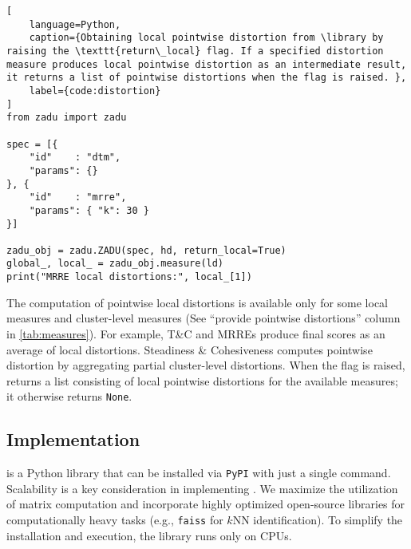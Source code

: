 \begin{lstlisting}[
    language=Python, 
    caption={Obtaining local pointwise distortion from \library by raising the \texttt{return\_local} flag. If a specified distortion measure produces local pointwise distortion as an intermediate result, it returns a list of pointwise distortions when the flag is raised. },
    label={code:distortion}
]
from zadu import zadu

spec = [{
    "id"    : "dtm",
    "params": {}
}, {
    "id"    : "mrre",
    "params": { "k": 30 }
}]

zadu_obj = zadu.ZADU(spec, hd, return_local=True)
global_, local_ = zadu_obj.measure(ld)
print("MRRE local distortions:", local_[1])

\end{lstlisting}

The computation of pointwise local distortions is available only for some local measures and cluster-level measures (See ``provide pointwise distortions'' column in \autoref{tab:measures}). For example, T\&C and MRREs produce final scores as an average of local distortions. Steadiness \& Cohesiveness \cite{jeon21tvcg} computes pointwise distortion by aggregating partial cluster-level distortions. When the flag is raised, \library returns a list consisting of local pointwise distortions for the available measures; it otherwise returns \texttt{None}. 




\subsection{Implementation}

\library is a Python library that can be installed via \texttt{PyPI} with just a single command. 
Scalability is a key consideration in implementing \library. We maximize the utilization of matrix computation and incorporate highly optimized open-source libraries for computationally heavy tasks (e.g., \texttt{faiss} \cite{johnson19tbd} for $k$NN identification). To simplify the installation and execution, the library runs only on CPUs. 

